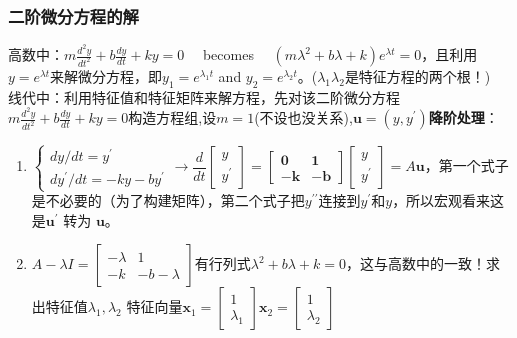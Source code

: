 \documentclass[UTF8]{article}
\begin{document}
    \subsubsection{二阶微分方程的解}
    高数中：$m \frac{d^{2} y}{d t^{2}}+b \frac{d y}{d t}+k y=0 \quad$ becomes $\quad\left(m \lambda^{2}+b \lambda+k\right) e^{\lambda t}=0$，且利用$y=e^{\lambda t}$来解微分方程，即$y_{1}=e^{\lambda_{1} t}$ and $y_{2}=e^{\lambda_{2} t}$。($\lambda_1 \lambda_2 $是特征方程的两个根！)
    \\
    线代中：利用特征值和特征矩阵来解方程，先对该二阶微分方程$m \frac{d^{2} y}{d t^{2}}+b \frac{d y}{d t}+k y=0$构造方程组,设$m=1$(不设也没关系),$\boldsymbol{u}=\left(y, y^{\prime}\right)$\textbf{降阶处理}：
    \begin{enumerate}
        \item $\left\{\begin{array}{l}{d y / d t=y^{\prime}} \\ {d y^{\prime} / d t=-k y-b y^{\prime}}\end{array}\right. \rightarrow \dfrac{d}{d t}\left[\begin{array}{l}{y} \\ {y^{\prime}}\end{array}\right]=\left[\begin{array}{rr}{\mathbf{0}} & {\mathbf{1}} \\ {-\boldsymbol{k}} & {-\boldsymbol{b}}\end{array}\right]\left[\begin{array}{l}{y} \\ {y^{\prime}}\end{array}\right]=A \boldsymbol{u}$，第一个式子是不必要的（为了构建矩阵），第二个式子把$y^{\prime \prime}$连接到$y^{\prime}$和$y$，所以宏观看来这是$\boldsymbol{u}^{\prime}$ 转为 $\boldsymbol{u}$。
        \item $A-\lambda I=\left[\begin{array}{cc}{-\lambda} & {1} \\ {-k} & {-b-\lambda}\end{array}\right]$有行列式$\lambda^{2}+b \lambda+k=0$，这与高数中的一致！求出特征值$\lambda_1, \lambda_2$ 特征向量$\boldsymbol{x}_{1}=\left[\begin{array}{l}{1} \\ {\lambda_{1}}\end{array}\right]$\quad $\boldsymbol{x}_{2}=\left[\begin{array}{c}{1} \\ {\lambda_{2}}\end{array}\right]$

\end{enumerate}
\end{document}
